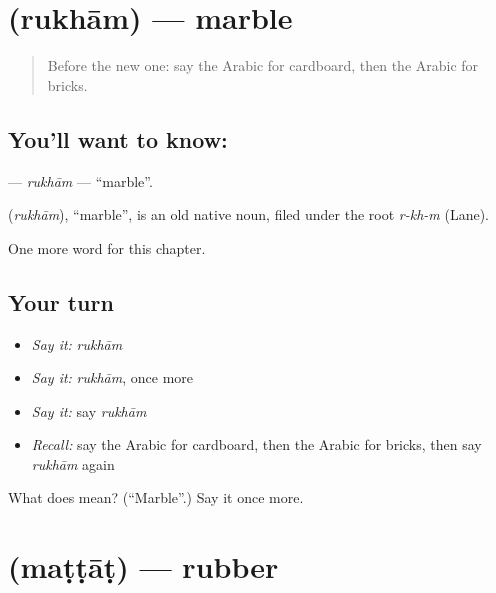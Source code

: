 \section[\texorpdfstring{\ar{رخام} (rukhām)}{رخام (rukhām)}]{ (rukhām) — marble}

\label{lesson:AR-C250-rukham}



\begin{quote}
Before the new one: say the Arabic for cardboard, then the Arabic for bricks.
\end{quote}

\subsection*{You'll want to know: }
\textbf{} — \emph{rukhām} — \textquotedblleft{}marble\textquotedblright{}.

\begin{cousinweb}
\textbf{} (\emph{rukhām}), \textquotedblleft{}marble\textquotedblright{}, is an old native noun, filed under the root \emph{r-kh-m} (Lane).
\end{cousinweb}

\begin{grammarlens}[title={What you've built}]
One more word for this chapter.
\end{grammarlens}

\subsection*{Your turn}
\begin{itemize}
\raggedright
  \item \emph{Say it:} \emph{rukhām}
  \item \emph{Say it:} \emph{rukhām}, once more
  \item \emph{Say it:} say \emph{rukhām}
  \item \emph{Recall:} say the Arabic for cardboard, then the Arabic for bricks, then say \emph{rukhām} again
\end{itemize}

\begin{tcolorbox}[breakable,colback=teal!4,colframe=teal!35!black,title={Before you move on}]
What does  mean? (\textquotedblleft{}Marble\textquotedblright{}.) Say it once more.
\end{tcolorbox}
\section[\texorpdfstring{\ar{مطاط} (maṭṭāṭ)}{مطاط (maṭṭāṭ)}]{ (maṭṭāṭ) — rubber}

